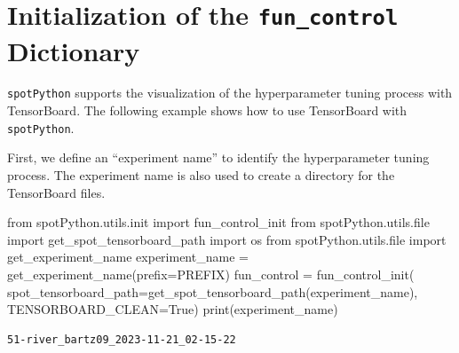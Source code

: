 \documentclass[
  letterpaper,
  DIV=11,
  numbers=noendperiod]{scrreprt}
\newenvironment{Shaded}{\begin{snugshade}}{\end{snugshade}}
\newcommand{\BuiltInTok}[1]{\textcolor[rgb]{0.00,0.23,0.31}{#1}}
\newcommand{\ImportTok}[1]{\textcolor[rgb]{0.00,0.46,0.62}{#1}}
\newcommand{\NormalTok}[1]{\textcolor[rgb]{0.00,0.23,0.31}{#1}}
\newcommand{\OperatorTok}[1]{\textcolor[rgb]{0.37,0.37,0.37}{#1}}
\newcommand{\VariableTok}[1]{\textcolor[rgb]{0.07,0.07,0.07}{#1}}
\begin{document}
\hypertarget{initialization-of-the-fun_control-dictionary-1}{%
\section{\texorpdfstring{Initialization of the \texttt{fun\_control}
Dictionary}{Initialization of the fun\_control Dictionary}}\label{initialization-of-the-fun_control-dictionary-1}}

\texttt{spotPython} supports the visualization of the hyperparameter
tuning process with TensorBoard. The following example shows how to use
TensorBoard with \texttt{spotPython}.

First, we define an ``experiment name'' to identify the hyperparameter
tuning process. The experiment name is also used to create a directory
for the TensorBoard files.

\begin{Shaded}
\begin{Highlighting}[]
\ImportTok{from}\NormalTok{ spotPython.utils.init }\ImportTok{import}\NormalTok{ fun\_control\_init}
\ImportTok{from}\NormalTok{ spotPython.utils.}\BuiltInTok{file} \ImportTok{import}\NormalTok{ get\_spot\_tensorboard\_path}
\ImportTok{import}\NormalTok{ os}
\ImportTok{from}\NormalTok{ spotPython.utils.}\BuiltInTok{file} \ImportTok{import}\NormalTok{ get\_experiment\_name}
\NormalTok{experiment\_name }\OperatorTok{=}\NormalTok{ get\_experiment\_name(prefix}\OperatorTok{=}\NormalTok{PREFIX)}
\NormalTok{fun\_control }\OperatorTok{=}\NormalTok{ fun\_control\_init(}
\NormalTok{    spot\_tensorboard\_path}\OperatorTok{=}\NormalTok{get\_spot\_tensorboard\_path(experiment\_name),}
\NormalTok{    TENSORBOARD\_CLEAN}\OperatorTok{=}\VariableTok{True}\NormalTok{)}
\BuiltInTok{print}\NormalTok{(experiment\_name)}
\end{Highlighting}
\end{Shaded}

\begin{verbatim}
51-river_bartz09_2023-11-21_02-15-22
\end{verbatim}
\end{document}
